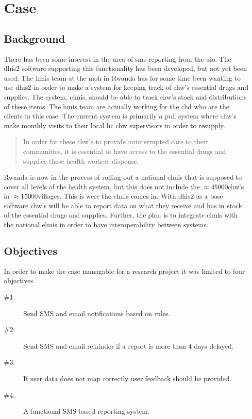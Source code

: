 \chapter{Case}
\section{Background}
There has been some interest in the area of \gls{sms} reporting from the \gls{uio}.
The \gls{dhis2} software supporting this functionality has been developed, but not yet been used.
The \gls{hmis} team at the \gls{moh} in Rwanda has for some time been wanting to use \gls{dhis2} in order to make a system for keeping track of \gls{chw}'s essential drugs and supplies. The system, \gls{clmis}, should be able to track \gls{chw}'s stock and distributions of these items. 
The \gls{hmis} team are actually working for the \gls{chd} who are the clients in this case. 
The current system is primarily a pull system where \gls{chw}'s make monthly visits to their local \gls{hc} \gls{chw} supervisors in order to resupply. 
\begin{quotation}
In order for these \gls{chw}'s to provide uninterrupted care to their communities, it is essential to have access to the essential drugs and supplies these health workers dispense.
\end{quotation}

Rwanda is now in the process of rolling out a national \gls{elmis} that is supposed to cover all levels of the health system, but this does not include the $\approx 45000$\gls{chw}'s in $\approx 15000$villages.
This is were the \gls{clmis} comes in. 
With \gls{dhis2} as a base software \gls{chw}'s will be able to report data on what they receive and has in stock of the essential drugs and supplies. 
Further, the plan is to integrate \gls{clmis} with the national \gls{elmis} in order to have interoperability between systems. 


\section{Objectives}
\label{sec:objectives}
In order to make the case managable for a research project it was limited to four objectives. 

\begin{description}
\item[\#1:] Send SMS and email notifications based on rules.\label{desc:objectiveone}
\item[\#2:] Send SMS and email reminder if a report is more than 4 days delayed.\label{desc:objectivetwo}
\item[\#3:] If user data does not map correctly user feedback should be provided.\label{desc:objectivethree}
\item[\#4:] A functional SMS based reporting system.\label{desc:objectivefour}
\end{description}

